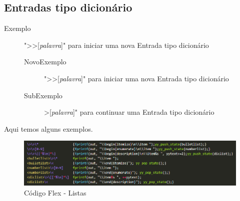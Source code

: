 \documentclass{report}
\begin{document}
\subsection{Entradas tipo dicionário
}
\begin{description}
\item[Exemplo]  "\textgreater\textgreater[\textit{palavra}]" para iniciar uma nova Entrada tipo dicionário
    \begin{description}
\item[NovoExemplo]  "\textgreater\textgreater[\textit{palavra}]" para iniciar uma nova Entrada tipo dicionário   
    \item[SubExemplo]  \textgreater[\textit{palavra}]" para continuar uma Entrada tipo dicionário
    \end{description}
\end{description}
Aqui temos alguns exemplos.

\begin{figure}[h]
	\centering
	\includegraphics[scale=0.7]{listas_flex.png}
	\caption{Código Flex - Listas}
\end{figure}


\newpage
\end{document}
